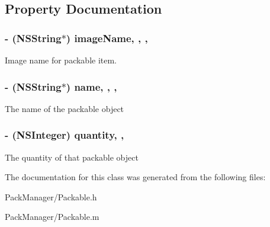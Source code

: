 \subsection{Property Documentation}
\hypertarget{interface_packable_a2e80759df98c998f7803409b1e945263}{
\subsubsection[{image\-Name}]{\setlength{\rightskip}{0pt plus 5cm}-\/ (N\-S\-String$\ast$) image\-Name\hspace{0.3cm}{\ttfamily [read]}, {\ttfamily [write]}, {\ttfamily [nonatomic]}, {\ttfamily [strong]}}}\label{interface_packable_a2e80759df98c998f7803409b1e945263}
Image name for packable item. \hypertarget{interface_packable_ac796b857c15e96bfe0cab64d4f855b8d}{
\subsubsection[{name}]{\setlength{\rightskip}{0pt plus 5cm}-\/ (N\-S\-String$\ast$) name\hspace{0.3cm}{\ttfamily [read]}, {\ttfamily [write]}, {\ttfamily [nonatomic]}, {\ttfamily [strong]}}}\label{interface_packable_ac796b857c15e96bfe0cab64d4f855b8d}
The name of the packable object \hypertarget{interface_packable_a1bcccd6d856e10d677a6ba2c86f87768}{
\subsubsection[{quantity}]{\setlength{\rightskip}{0pt plus 5cm}-\/ (N\-S\-Integer) quantity\hspace{0.3cm}{\ttfamily [read]}, {\ttfamily [write]}, {\ttfamily [atomic]}}}\label{interface_packable_a1bcccd6d856e10d677a6ba2c86f87768}
The quantity of that packable object 

The documentation for this class was generated from the following files\-:\begin{DoxyCompactItemize}
\item 
Pack\-Manager/Packable.\-h\item 
Pack\-Manager/Packable.\-m\end{DoxyCompactItemize}
